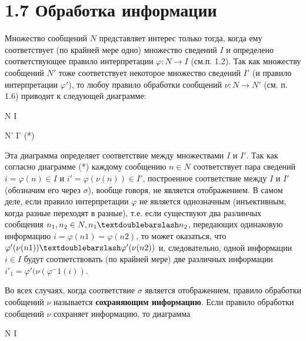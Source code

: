 \documentclass[12pt]{report}
\begin{document}
\section*{\large{1.7 Обработка информации}}


\footnotesize{Множество сообщений $N$ представляет интерес только тогда, когда ему соответствует (по крайней мере одно) множество сведений $I$ и определено соответствующее правило интерпретации $\varphi:N \to I$ (см.п. 1.2). Так как множеству сообщений $N'$ тоже соответствует некоторое множество сведений $I'$ (и правило интерпретации $\varphi'$), то любоу правило обработки сообщений $\nu:N \to N'$ (см. п. 1.6) приводит к следующей диаграмме:
\newline
\begin{math*}


    \qquad \qquad \quad N \overset{\varphi}{\to} I

     
    \qquad \qquad {\nu}\shortdownarrow \qquad \Downarrow{\sigma}

     
   \qquad \quad \qquad N'  I' \qquad \qquad \qquad \qquad \qquad \qquad \qquad \qquad \qquad \qquad \qquad \quad \eqno(*)
   \newline
   
\end{math*}
Эта диаграмма определяет соответствие между множествами $I$ и $I'$. Так как согласно диаграмме (*) каждому сообщению $n \in N$ соответствует пара сведений $i = \varphi(n) \in I$ и $i' = \varphi(\nu(n)) \in I'$, построенное соответствие между $I$ и $I'$ (обозначим его через $\sigma$), вообще говоря, не является отображением. В самом деле, если правило интерпретации $\varphi$ не является однозначным (инъективным, когда разные переходят в разные), т.е. если существуют два разлинчых сообщения $n_1,n_2 \in N, n_1 \textdoublebarslash n_2$, передающих одинаковую информацию $i = \varphi(n1) = \varphi(n2)$, то может оказаться, что $\varphi'(\nu(n1)) \textdoublebarslash \varphi'(\nu(n2))$ и, следовательно, одной информации $i \in I$ будут соответствовать (по крайней мере) две различных информации $i'_1 = \varphi'(\nu(\varphi^-1(i))$.


Во всех случаях, когда соответствие $\sigma$ является отображением, правило обработки сообщений $\nu$ называется \textbf{сохраняющим информацию}. Если правило обработки сообщений $\nu$ сохраняет информацию, то диаграмма
\newline
\begin{math*}


    \qquad \qquad \quad N \overset{\varphi}{\to} I


\end{math*}}
\end{document}
